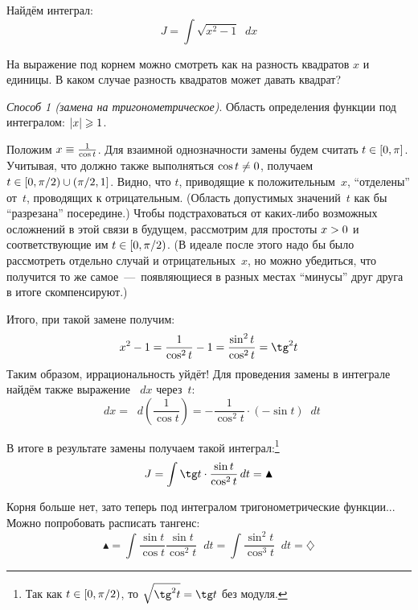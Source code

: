 \documentclass[a4paper,12pt]{article}
\newcommand{\diff}{\mathop{}\!d}
\begin{document}
  \begin{example}
    Найдём интеграл:
    \begin{equation}\label{eq:sqrt-example-int}
      J = \int \sqrt{x^2 - 1} \diff x
    \end{equation}

    На выражение под корнем можно смотреть как на разность квадратов $x$ и единицы.
    В каком случае разность квадратов может давать квадрат?

    \medskip

    \noindent
    \emph{Способ 1 (замена на тригонометрическое)}.
    Область определения функции под интегралом: $|x| \hm\geq 1$.
    
    Положим $x \hm\equiv \frac{1}{\cos t}$.
    Для взаимной однозначности замены будем считать $t \hm\in [0, \pi]$.
    Учитывая, что должно также выполняться $\cos t \hm{\not=} 0$, получаем $t \in [0, \pi/2) \hm\cup (\pi/2, 1]$.
    Видно, что $t$, приводящие к положительным~$x$, ``отделены'' от~$t$, проводящих к отрицательным.
    (Область допустимых значений~$t$ как бы ``разрезана'' посередине.)
    Чтобы подстраховаться от каких-либо возможных осложнений в этой связи в будущем, рассмотрим для простоты $x \hm> 0$ и соответствующие им $t \hm\in [0, \pi/2)$.
    (В идеале после этого надо бы было рассмотреть отдельно случай и отрицательных~$x$, но можно убедиться, что получится то же самое~---~появляющиеся в разных местах ``минусы'' друг друга в итоге скомпенсируют.)
    
    Итого, при такой замене получим:
    \[
      x^2 - 1 = \frac{1}{\cos^2 t} - 1 = \frac{\sin^2 t}{\cos^2 t} = \tg^2 t
    \]
    Таким образом, иррациональность уйдёт!
    Для проведения замены в интеграле найдём также выражение $\diff x$ через~$t$:
    \[
      \diff x = \diff\left(\frac{1}{\cos t}\right) = -\frac{1}{\cos^2 t} \cdot (-\sin t) \diff t
    \]

    В итоге в результате замены получаем такой интеграл:\footnote{
      Так как $t \hm\in [0, \pi/2)$, то $\sqrt{\tg^2 t} = \tg t$ без модуля.
    }
    \[
      J = \int \tg t \cdot \frac{\sin t}{\cos^2 t} \diff t = \blacktriangle
    \]

    Корня больше нет, зато теперь под интегралом тригонометрические функции...
    Можно попробовать расписать тангенс:
    \[
      \blacktriangle = \int \frac{\sin t}{\cos t} \frac{\sin t}{\cos^2 t} \diff t = \int \frac{\sin^2 t}{\cos^3 t} \diff t = \diamondsuit
    \]


\end{example}
\end{document}
